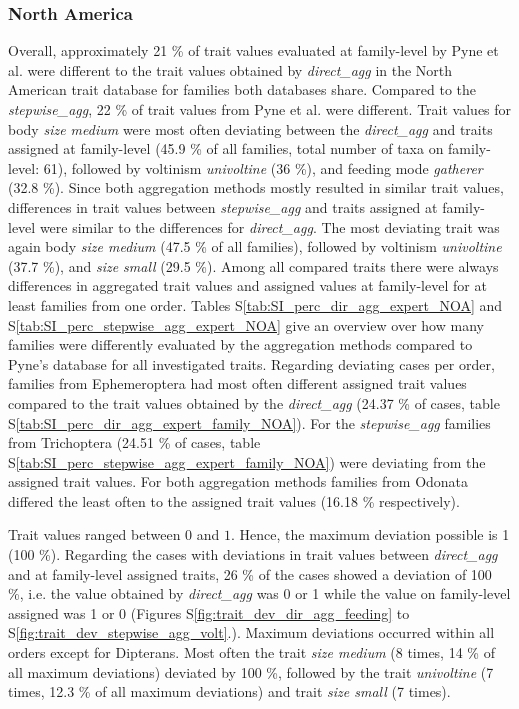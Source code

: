 \documentclass{article}
\begin{document}
\subsubsection{North America}
Overall, approximately 21 \% of trait values evaluated at family-level by Pyne et al. were different to the trait values obtained by \textit{direct\_agg} in the North American trait database for families both databases share. Compared to the \textit{stepwise\_agg}, 22 \% of trait values from Pyne et al. were different. Trait values for body \textit{size medium} were most often deviating between the \textit{direct\_agg} and traits assigned at family-level (45.9 \% of all families, total number of taxa on family-level: 61), followed by voltinism 
\textit{univoltine} (36 \%), and feeding mode \textit{gatherer} (32.8 \%). Since both aggregation methods mostly resulted in similar trait values, differences in trait values between \textit{stepwise\_agg} and traits assigned at family-level were similar to the differences for \textit{direct\_agg}. The most deviating trait was again body \textit{size medium} (47.5 \% of all families), followed by voltinism \textit{univoltine} (37.7 \%), and \textit{size small} (29.5 \%). Among all compared traits there were always differences in aggregated trait values and
assigned values at family-level for at least families from one order. Tables S\ref{tab:SI_perc_dir_agg_expert_NOA} and S\ref{tab:SI_perc_stepwise_agg_expert_NOA} give an overview over how many families were differently evaluated by the aggregation methods compared to Pyne's database for all investigated traits.
Regarding deviating cases per order, families from Ephemeroptera had most often different assigned trait values compared to the trait values obtained by the \textit{direct\_agg} (24.37 \% of cases, table S\ref{tab:SI_perc_dir_agg_expert_family_NOA}). For the \textit{stepwise\_agg} families from Trichoptera (24.51 \% of cases, table S\ref{tab:SI_perc_stepwise_agg_expert_family_NOA}) were deviating from the assigned trait values. For both aggregation methods families from Odonata differed the least often to the assigned trait values (16.18 \% respectively).

Trait values ranged between $0$ and $1$. Hence, the maximum deviation possible is 1 (100 \%). Regarding the cases with deviations in trait values between \textit{direct\_agg} and at family-level assigned traits, 26 \% of the cases showed a deviation of 100 \%, i.e. the value obtained by \textit{direct\_agg} was 0 or 1 while the value on family-level assigned was 1 or 0 (Figures S\ref{fig:trait_dev_dir_agg_feeding} to S\ref{fig:trait_dev_stepwise_agg_volt}.). Maximum deviations occurred within all orders except for Dipterans. Most often the trait \textit{size medium} (8 times, 14 \% of all maximum deviations) deviated by 100 \%, followed by the trait \textit{univoltine} (7 times, 12.3 \% of all maximum deviations) and trait \textit{size small} (7 times).
\end{document}
